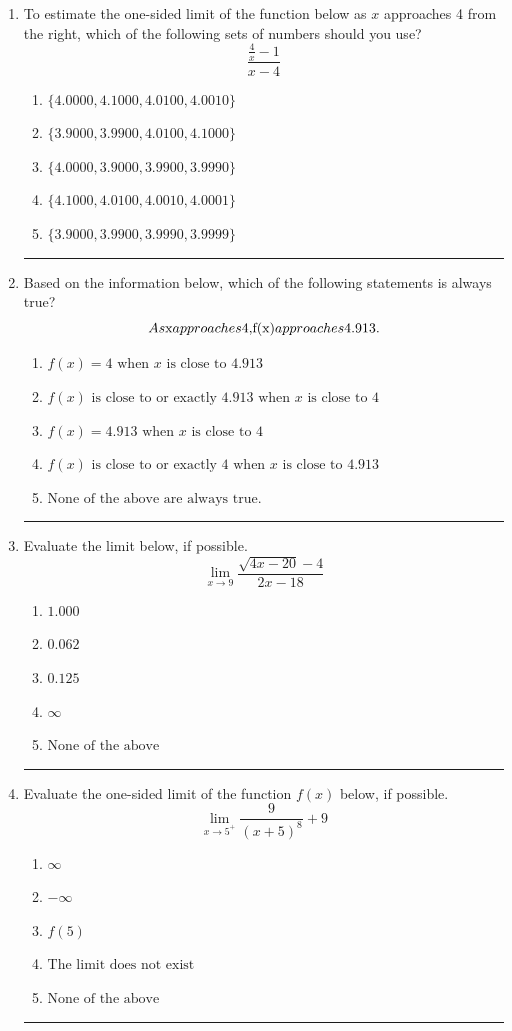\documentclass[14pt]{extbook}
\newcommand{\litem}[1]{\item#1\hspace*{-1cm}\rule{\textwidth}{0.4pt}}
\begin{document}
\begin{enumerate}
\litem{
To estimate the one-sided limit of the function below as $x$ approaches 4 from the right, which of the following sets of numbers should you use?\[ \frac{\frac{4}{x} - 1}{x - 4} \]\begin{enumerate}[label=\Alph*.]
\item \( \{ 4.0000, 4.1000, 4.0100, 4.0010 \} \)
\item \( \{ 3.9000, 3.9900, 4.0100, 4.1000 \} \)
\item \( \{ 4.0000, 3.9000, 3.9900, 3.9990 \} \)
\item \( \{ 4.1000, 4.0100, 4.0010, 4.0001 \} \)
\item \( \{ 3.9000, 3.9900, 3.9990, 3.9999 \} \)

\end{enumerate} }
\litem{
Based on the information below, which of the following statements is always true?\[ As $x$ approaches $4$, $f(x)$ approaches $4.913$. \]\begin{enumerate}[label=\Alph*.]
\item \( f(x) = 4 \text{ when } x \text{ is close to } 4.913 \)
\item \( f(x) \text{ is close to or exactly } 4.913 \text{ when } x \text{ is close to } 4 \)
\item \( f(x) = 4.913 \text{ when } x \text{ is close to } 4 \)
\item \( f(x) \text{ is close to or exactly } 4 \text{ when } x \text{ is close to } 4.913 \)
\item \( \text{None of the above are always true.} \)

\end{enumerate} }
\litem{
Evaluate the limit below, if possible.\[ \lim_{x \rightarrow 9} \frac{\sqrt{4x - 20} - 4}{2x - 18} \]\begin{enumerate}[label=\Alph*.]
\item \( 1.000 \)
\item \( 0.062 \)
\item \( 0.125 \)
\item \( \infty \)
\item \( \text{None of the above} \)

\end{enumerate} }
\litem{
Evaluate the one-sided limit of the function $f(x)$ below, if possible.\[ \lim_{x \rightarrow 5^+} \frac{9}{(x+5)^8}+9 \]\begin{enumerate}[label=\Alph*.]
\item \( \infty \)
\item \( -\infty \)
\item \( f(5) \)
\item \( \text{The limit does not exist} \)
\item \( \text{None of the above} \)


\end{enumerate}}
\end{enumerate}
\end{document}
